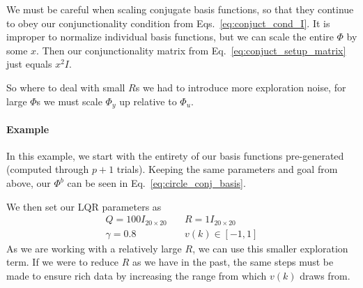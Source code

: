 We must be careful when scaling conjugate basis functions, so that they continue to obey our conjunctionality condition from Eqs.~\ref{eq:conjuct_cond_I}. It is improper to normalize individual basis functions, but we can scale the entire $\Phi$ by some $x$. Then our conjunctionality matrix from Eq.~\ref{eq:conjuct_setup_matrix} just equals $x^2I$.

So where to deal with small $R$s we had to introduce more exploration noise, for large $\Phi$s we must scale $\Phi_y$ up relative to $\Phi_u$.

\FloatBarrier\paragraph{Example }
In this example, we start with the entirety of our basis functions pre-generated (computed through $p+1$ trials). Keeping the same parameters and goal from above, our $\Phi^b$ can be seen in Eq.~\ref{eq:circle_conj_basis}.

We then set our LQR parameters as
\begin{equation}
    \begin{split}
        Q = 100I_{20 \times 20}
        &\quad
        R = 1I_{20 \times 20}   \\
        \gamma = 0.8
        &\quad
        v(k) \in \left[-1, 1\right]
    \end{split}
\end{equation}
As we are working with a relatively large $R$, we can use this smaller exploration term. If we were to reduce $R$ as we have in the past, the same steps must be made to ensure rich data by increasing the range from which $v(k)$ draws from.

